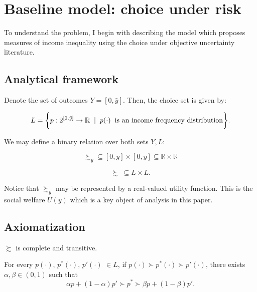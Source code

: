 \documentclass[Chp3.tex]{subfiles}
\begin{document}
\section{Baseline model: choice under risk}
\label{sec:BaselineModel}

\par To understand the problem, I begin with describing the model which proposes measures of income inequality using the choice under objective uncertainty literature. 

\subsection{Analytical framework}

\par Denote the set of outcomes $Y = [0,\bar{y}]$. Then, the choice set is given by:

$$ L = \bigg\{ p: 2^{[0,\bar{y}]} \to \mathbb{R} \hspace{2mm} | \hspace{2mm} p(\cdot) \hspace{2mm} \text{is an income frequency distribution}  \bigg\}. $$

\par We may define a binary relation over both sets $Y,L:$

$$ \succsim_{y} \subseteq [0,\bar{y}] \times [0,\bar{y}] \subseteq \mathbb{R} \times \mathbb{R} $$

$$ \succsim \; \subseteq L \times L. $$

\par Notice that $\succsim_y$ may be represented by a real-valued utility function. This is the social welfare $U(y)$ which is a key object of analysis in this paper. 

\subsection{Axiomatization}

\begin{ax.V}
$\succsim$ is complete and transitive.
\end{ax.V}

\begin{ax.V}[Continuity]
For every $p(\cdot)$, $p^*(\cdot)$, $p'(\cdot)$ $\in L$, if $p(\cdot) \succ p^*(\cdot) \succ p'(\cdot) $, there exists $\alpha, \beta \in (0,1)$ such that 
$$ \alpha p + (1-\alpha)p' \succ p^* \succ \beta p + (1-\beta) p' .$$ 
\end{ax.V}
\end{document}
